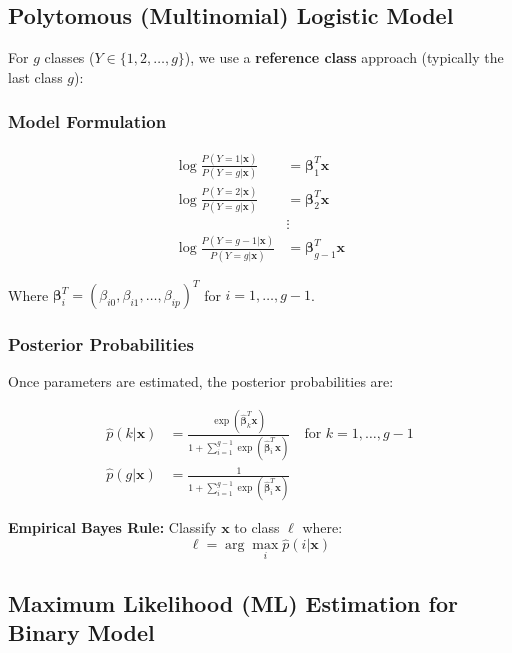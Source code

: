 \documentclass[12pt,a4paper]{article}
\begin{document}
\subsection{Polytomous (Multinomial) Logistic Model}

For $g$ classes ($Y \in \{1,2,\ldots,g\}$), we use a \textbf{reference class} approach (typically the last class $g$):

\subsubsection{Model Formulation}

\begin{align}
\log\frac{P(Y=1|\mathbf{x})}{P(Y=g|\mathbf{x})} &= \boldsymbol{\beta}_1^T\mathbf{x} \\
\log\frac{P(Y=2|\mathbf{x})}{P(Y=g|\mathbf{x})} &= \boldsymbol{\beta}_2^T\mathbf{x} \\
&\vdots \\
\log\frac{P(Y=g-1|\mathbf{x})}{P(Y=g|\mathbf{x})} &= \boldsymbol{\beta}_{g-1}^T\mathbf{x}
\end{align}

Where $\boldsymbol{\beta}_i^T = (\beta_{i0}, \beta_{i1}, \ldots, \beta_{ip})^T$ for $i = 1, \ldots, g-1$.

\subsubsection{Posterior Probabilities}

Once parameters are estimated, the posterior probabilities are:

\begin{align}
\hat{p}(k|\mathbf{x}) &= \frac{\exp(\hat{\boldsymbol{\beta}}_k^T\mathbf{x})}{1 + \sum_{i=1}^{g-1} \exp(\hat{\boldsymbol{\beta}}_i^T\mathbf{x})} \quad \text{for } k = 1, \ldots, g-1 \\
\hat{p}(g|\mathbf{x}) &= \frac{1}{1 + \sum_{i=1}^{g-1} \exp(\hat{\boldsymbol{\beta}}_i^T\mathbf{x})}
\end{align}

\begin{tcolorbox}[colback=yellow!5!white,colframe=orange!75!black,title=Classification Rule]
\textbf{Empirical Bayes Rule:} Classify $\mathbf{x}$ to class $\ell$ where:
$$\ell = \arg\max_i \hat{p}(i|\mathbf{x})$$
\end{tcolorbox}

\subsection{Maximum Likelihood (ML) Estimation for Binary Model}
\end{document}
